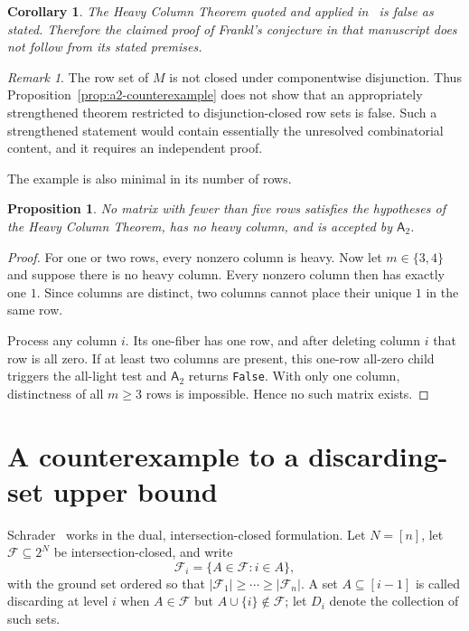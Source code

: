 \documentclass[11pt]{amsart}
\newtheorem{proposition}[theorem]{Proposition}
\newtheorem{corollary}[theorem]{Corollary}
\theoremstyle{definition}
\theoremstyle{remark}
\newtheorem{remark}[theorem]{Remark}
\newcommand{\F}{\mathcal F}
\newcommand{\Aalg}{\mathsf A_2}
\newcommand{\False}{\texttt{False}}
\begin{document}
\begin{corollary}\label{cor:heavy-false}
The Heavy Column Theorem quoted and applied in~\cite{AbdurakhmanovFrankl2026} is false as stated. Therefore the claimed proof of Frankl's conjecture in that manuscript does not follow from its stated premises.
\end{corollary}

\begin{remark}
The row set of $M$ is not closed under componentwise disjunction. Thus Proposition~\ref{prop:a2-counterexample} does not show that an appropriately strengthened theorem restricted to disjunction-closed row sets is false. Such a strengthened statement would contain essentially the unresolved combinatorial content, and it requires an independent proof.
\end{remark}

The example is also minimal in its number of rows.

\begin{proposition}\label{prop:row-minimal}
No matrix with fewer than five rows satisfies the hypotheses of the Heavy Column Theorem, has no heavy column, and is accepted by $\Aalg$.
\end{proposition}

\begin{proof}
For one or two rows, every nonzero column is heavy. Now let $m\in\{3,4\}$ and suppose there is no heavy column. Every nonzero column then has exactly one $1$. Since columns are distinct, two columns cannot place their unique $1$ in the same row.

Process any column $i$. Its one-fiber has one row, and after deleting column $i$ that row is all zero. If at least two columns are present, this one-row all-zero child triggers the all-light test and $\Aalg$ returns \False. With only one column, distinctness of all $m\ge3$ rows is impossible. Hence no such matrix exists.
\end{proof}

\section{A counterexample to a discarding-set upper bound}\label{sec:schrader}

Schrader~\cite{Schrader2025} works in the dual, intersection-closed formulation. Let $N=[n]$, let $\F\subseteq 2^N$ be intersection-closed, and write
\[
  \F_i=\{A\in\F:i\in A\},
\]
with the ground set ordered so that $|\F_1|\ge\cdots\ge|\F_n|$. A set $A\subseteq[i-1]$ is called discarding at level $i$ when $A\in\F$ but $A\cup\{i\}\notin\F$; let $D_i$ denote the collection of such sets.
\end{document}

